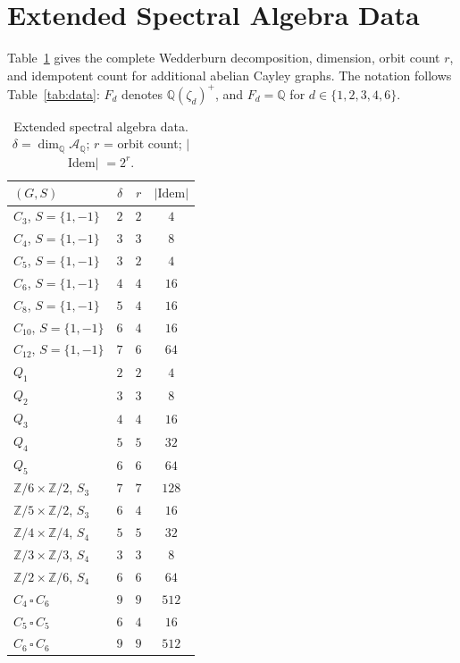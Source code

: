 \documentclass[12pt]{amsart}
\numberwithin{equation}{section}
\theoremstyle{plain}
\theoremstyle{definition}
\newcommand{\Z}{\mathbb{Z}}
\newcommand{\Q}{\mathbb{Q}}
\newcommand{\calA}{\mathcal{A}}
\begin{document}
\appendix

\section{Extended Spectral Algebra Data}
\label{app:extended}

Table~\ref{tab:extended} gives the complete Wedderburn decomposition,
dimension, orbit count $r$, and idempotent count for additional abelian
Cayley graphs.  The notation follows Table~\ref{tab:data}: $F_d$ denotes
$\Q(\zeta_d)^+$, and $F_d = \Q$ for $d \in \{1,2,3,4,6\}$.

\begin{table}[ht]
\centering
\caption{Extended spectral algebra data. $\delta = \dim_\Q \calA_\Q$;
  $r$ = orbit count; $|$Idem$|$ $= 2^r$.}
\label{tab:extended}
\renewcommand{\arraystretch}{1.15}
\small
\begin{tabular}{p{2.5cm}ccc}
\toprule
$(G, S)$ & $\delta$ & $r$ & $|\text{Idem}|$ \\
\midrule
$C_3$, $S=\{1,-1\}$ & $2$ & $2$ & $4$ \\
$C_4$, $S=\{1,-1\}$ & $3$ & $3$ & $8$ \\
$C_5$, $S=\{1,-1\}$ & $3$ & $2$ & $4$ \\
$C_6$, $S=\{1,-1\}$ & $4$ & $4$ & $16$ \\
$C_8$, $S=\{1,-1\}$ & $5$ & $4$ & $16$ \\
$C_{10}$, $S=\{1,-1\}$ & $6$ & $4$ & $16$ \\
$C_{12}$, $S=\{1,-1\}$ & $7$ & $6$ & $64$ \\
$Q_1$ & $2$ & $2$ & $4$ \\
$Q_2$ & $3$ & $3$ & $8$ \\
$Q_3$ & $4$ & $4$ & $16$ \\
$Q_4$ & $5$ & $5$ & $32$ \\
$Q_5$ & $6$ & $6$ & $64$ \\
$\Z/6{\times}\Z/2$, $S_3$ & $7$ & $7$ & $128$ \\
$\Z/5{\times}\Z/2$, $S_3$ & $6$ & $4$ & $16$ \\
$\Z/4{\times}\Z/4$, $S_4$ & $5$ & $5$ & $32$ \\
$\Z/3{\times}\Z/3$, $S_4$ & $3$ & $3$ & $8$ \\
$\Z/2{\times}\Z/6$, $S_4$ & $6$ & $6$ & $64$ \\
$C_4\,{\square}\,C_6$ & $9$ & $9$ & $512$ \\
$C_5\,{\square}\,C_5$ & $6$ & $4$ & $16$ \\
$C_6\,{\square}\,C_6$ & $9$ & $9$ & $512$ \\
\bottomrule
\end{tabular}
\end{table}
\end{document}
